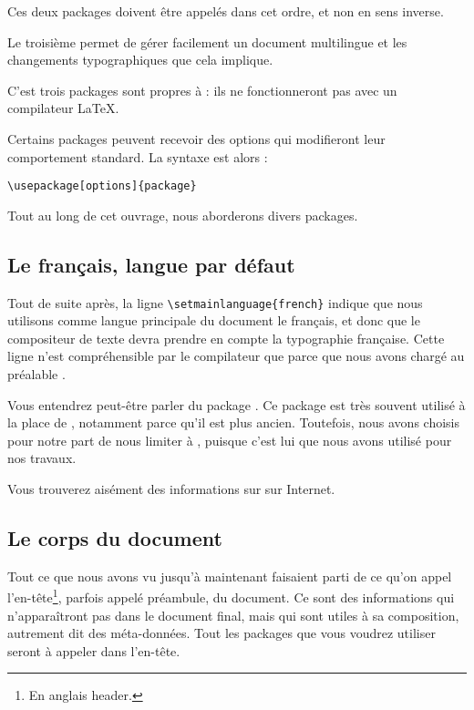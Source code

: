 \begin{attention}
Ces deux packages doivent être appelés dans cet ordre, et non en sens inverse.
\end{attention}

Le troisième permet de gérer facilement un document multilingue et les changements typographiques que cela implique.

C'est trois packages sont propres à \XeLaTeX  : ils ne fonctionneront pas avec un compilateur \LaTeX.

Certains packages peuvent recevoir des options qui modifieront leur comportement standard. La syntaxe est alors :

\verb|\usepackage[options]{package}|

Tout au long de cet ouvrage, nous aborderons divers packages.

\subsection{Le fran\c cais, langue par défaut\label{french}}

Tout de suite après, la ligne \verb|\setmainlanguage{french}| indique que nous utilisons comme langue principale du document le fran\c cais, et donc que le compositeur de texte devra prendre en compte la typographie fran\c caise. Cette ligne n'est compréhensible par le compilateur que parce que nous avons chargé au préalable .

\begin{anedocte}
Vous entendrez peut-être parler du package . Ce package est très souvent utilisé à la place de , notamment parce qu'il est plus ancien. Toutefois, nous avons choisis pour notre part de nous limiter à , puisque c'est lui que nous avons utilisé pour nos travaux.

Vous trouverez aisément des informations sur  sur Internet.

\end{anedocte}

\subsection{Le corps du document}

Tout ce que nous avons vu jusqu'à maintenant faisaient parti de ce qu'on appel l'en-tête\footnote{En anglais header.}, parfois appelé préambule, du document. Ce sont des informations qui n'apparaîtront pas dans le document final, mais qui sont utiles à sa composition, autrement dit des méta-données. Tout les packages que vous voudrez utiliser seront à appeler dans l'en-tête.

